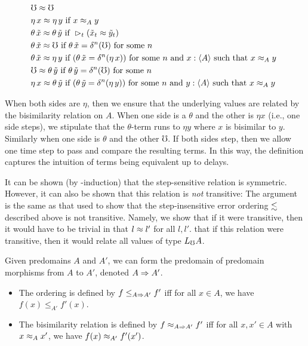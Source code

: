 \begin{align*}
  &\mho \bisim \mho \\
%
  &\eta\, x \bisim \eta\, y \text{ if } 
    x \bisim_A y \\
%		
  &\theta\, \tilde{x} \bisim \theta\, \tilde{y} \text{ if } 
    \later_t (\tilde{x}_t \bisim \tilde{y}_t) \\
%	
  &\theta\, \tilde{x} \bisim \mho \text{ if } 
    \theta\, \tilde{x} = \delta^n(\mho) \text { for some $n$ } \\
%	
  &\theta\, \tilde{x} \bisim \eta\, y \text{ if }
    (\theta\, \tilde{x} = \delta^n(\eta\, x))
  \text { for some $n$ and $x : \ty{A}$ such that $x \bisim_A y$ } \\
%
  &\mho \bisim \theta\, \tilde{y} \text { if } 
    \theta\, \tilde{y} = \delta^n(\mho) \text { for some $n$ } \\
%	
  &\eta\, x \bisim \theta\, \tilde{y} \text { if }
    (\theta\, \tilde{y} = \delta^n (\eta\, y))
  \text { for some $n$ and $y : \ty{A}$ such that $x \bisim_A y$ }
\end{align*}

When both sides are $\eta$, then we ensure that the underlying values are related
by the bisimilarity relation on $A$.
When one side is a $\theta$ and the other is $\eta x$ (i.e., one side steps),
we stipulate that the $\theta$-term runs to $\eta y$ where $x$ is bisimilar to $y$.
Similarly when one side is $\theta$ and the other $\mho$.
If both sides step, then we allow one time step to pass and compare the resulting terms.
In this way, the definition captures the intuition of terms being equivalent up to
delays.

It can be shown (by \lob-induction) that the step-sensitive relation is symmetric.
However, it can also be shown that this relation is \emph{not} transitive:
The argument is the same as that used to show that the step-insensitive error
ordering $\lesssim$ described above is not transitive. Namely, we show that
if it were transitive, then it would have to be trivial in that $l \approx l'$ for all $l, l'$.
that if this relation were transitive, then it would relate all values of type $L_\mho A$.


Given predomains $A$ and $A'$, we can form the predomain of
predomain morphisms from $A$ to $A'$, denoted $A \Rightarrow A'$.
\begin{itemize}
    \item The ordering is defined by $f \le_{A \Rightarrow A'} f'$ iff for all
    $x \in A$, we have $f(x) \le_{A'} f'(x)$.
    \item The bisimilarity relation is defined by $f \approx_{A \Rightarrow A'} f'$ iff
    for all $x, x' \in A$ with $x \approx_{A} x'$, we have $f(x) \approx_{A'} f'(x')$. 
\end{itemize}

